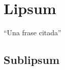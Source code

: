 \chapter{Lipsum}\label{cap:lipsum}
\enquote{Una frase citada}
\lipsum
\section{Sublipsum}\label{sec:sublipsum}
\lipsum

\endinput
